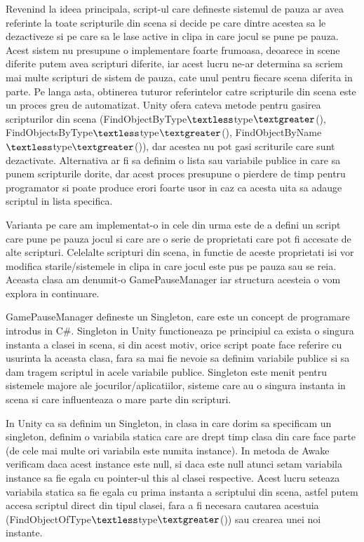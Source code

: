 \documentclass[12pt, a4paper]{article}
\begin{document}
	Revenind la ideea principala, script-ul care defineste sistemul de pauza ar avea referinte la toate scripturile din scena si decide pe care dintre acestea sa le dezactiveze si pe care sa le lase active in clipa in care jocul se pune pe pauza. Acest sistem nu presupune o implementare foarte frumoasa, deoarece in scene diferite putem avea scripturi diferite, iar acest lucru ne-ar determina sa scriem mai multe scripturi de sistem de pauza, cate unul pentru fiecare scena diferita in parte. Pe langa asta, obtinerea tuturor referintelor catre scripturile din scena este un proces greu de automatizat. Unity ofera cateva metode pentru gasirea scripturilor din scena (FindObjectByType$\textless$type$\textgreater$(), FindObjectsByType$\textless$type$\textgreater$(), FindObjectByName$\textless$type$\textgreater$()), dar acestea nu pot gasi scriturile care sunt dezactivate. Alternativa ar fi sa definim o lista sau variabile publice in care sa punem scripturile dorite, dar acest proces presupune o pierdere de timp pentru programator si poate produce erori foarte usor in caz ca acesta uita sa adauge scriptul in lista specifica.
	\newline
	
	Varianta pe care am implementat-o in cele din urma este de a defini un script care pune pe pauza jocul si care are o serie de proprietati care pot fi accesate de alte scripturi. Celelalte scripturi din scena, in functie de aceste proprietati isi vor modifica starile/sistemele in clipa in care jocul este pus pe pauza sau se reia. Aceasta clasa am denumit-o GamePauseManager iar structura acesteia o vom explora in continuare.
	\newline
	
	GamePauseManager defineste un Singleton, care este un concept de programare introdus in C\#. Singleton in Unity functioneaza pe principiul ca exista o singura instanta a clasei in scena, si din acest motiv, orice script poate face referire cu usurinta la aceasta clasa, fara sa mai fie nevoie sa definim variabile publice si sa dam tragem scriptul in acele variabile publice. Singleton este menit pentru sistemele majore ale jocurilor/aplicatiilor, sisteme care au o singura instanta in scena si care influenteaza o mare parte din scripturi. 
	\newline
	
	In Unity ca sa definim un Singleton, in clasa in care dorim sa specificam un singleton, definim o variabila statica care are drept timp clasa din care face parte (de cele mai multe ori variabila este numita instance). In metoda de Awake verificam daca acest instance este null, si daca este null atunci setam variabila instance sa fie egala cu pointer-ul this al clasei respective. Acest lucru seteaza variabila statica sa fie egala cu prima instanta a scriptului din scena, astfel putem accesa scriptul direct din tipul clasei, fara a fi necesara cautarea acestuia (FindObjectOfType$\textless$type$\textgreater$()) sau crearea unei noi instante. 
	\newline
	
\end{document}
